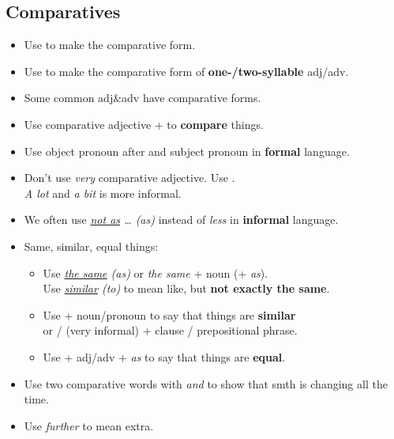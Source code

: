 \subsection{Comparatives}
\begin{itemize}
    \item Use  to make the comparative form.
    \item Use  to make the comparative form of \textbf{one-/two-syllable} adj/adv.
    \item Some common adj\&adv have  comparative forms.
    \item Use comparative adjective +  to \textbf{compare} things.
    \item[\doot] Use object pronoun after  and subject pronoun in \textbf{formal} language.
    \item Don't use \textit{very}  comparative adjective.
    Use .\\
    \textit{A lot} and \textit{a bit} is more informal.
    \item We often use \textit{\underline{not as} \ldots{} (as)} instead of \textit{less} in \textbf{informal} language.
    \item Same, similar, equal things:
    \begin{itemize}
        \item[\doot] Use \textit{\underline{the same} (as)} or \textit{the same} + noun (+ \textit{as}).\\
        Use \textit{\underline{similar} (to)} to mean like, but \textbf{not exactly the same}.
        \item[\doot] Use  + noun/pronoun to say that things are \textbf{similar}\\
        or  /  (very informal) + clause / prepositional phrase.
        \item Use  + adj/adv + \textit{as} to say that things are \textbf{equal}.
    \end{itemize}
    \item[\aast] Use two comparative words with \textit{and} to show that smth is changing all the time.
    \item[\aast] Use \textit{further} to mean extra.
\end{itemize}

